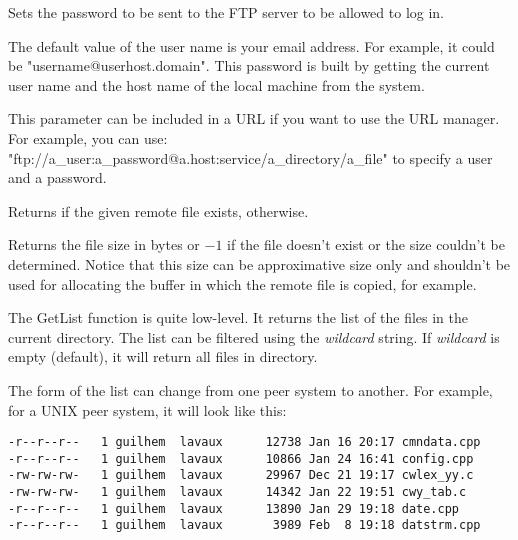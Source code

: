 \label{wxftpsetpassword}


Sets the password to be sent to the FTP server to be allowed to log in.


The default value of the user name is your email address. For example, it could
be "username@userhost.domain". This password is built by getting the current
user name and the host name of the local machine from the system.


This parameter can be included in a URL if you want to use the URL manager.
For example, you can use: "ftp://a\_user:a\_password@a.host:service/a\_directory/a\_file"
to specify a user and a password.



\label{wxftpfileexists}


Returns \true if the given remote file exists, \false otherwise.


\label{wxftpgetfilesize}


Returns the file size in bytes or $-1$ if the file doesn't exist or the size
couldn't be determined. Notice that this size can be approximative size only
and shouldn't be used for allocating the buffer in which the remote file is
copied, for example.


\label{wxftpgetdirlist}


The GetList function is quite low-level. It returns the list of the files in
the current directory. The list can be filtered using the {\it wildcard} string.
If {\it wildcard} is empty (default), it will return all files in directory.

The form of the list can change from one peer system to another. For example,
for a UNIX peer system, it will look like this:

\begin{verbatim}
-r--r--r--   1 guilhem  lavaux      12738 Jan 16 20:17 cmndata.cpp
-r--r--r--   1 guilhem  lavaux      10866 Jan 24 16:41 config.cpp
-rw-rw-rw-   1 guilhem  lavaux      29967 Dec 21 19:17 cwlex_yy.c
-rw-rw-rw-   1 guilhem  lavaux      14342 Jan 22 19:51 cwy_tab.c
-r--r--r--   1 guilhem  lavaux      13890 Jan 29 19:18 date.cpp
-r--r--r--   1 guilhem  lavaux       3989 Feb  8 19:18 datstrm.cpp
\end{verbatim}

